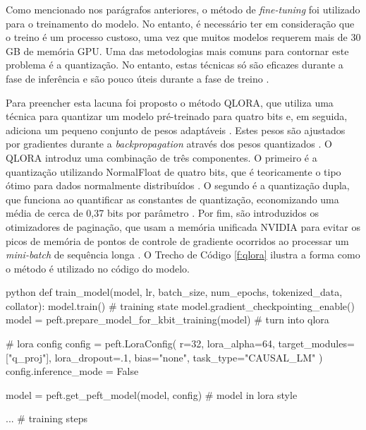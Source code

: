Como mencionado nos parágrafos anteriores, o método de \textit{fine-tuning} foi utilizado para o treinamento do modelo. No entanto, é necessário ter em consideração que o treino é um processo custoso, uma vez que muitos modelos requerem mais de 30 GB de memória GPU. Uma das metodologias mais comuns para contornar este problema é a quantização. No entanto, estas técnicas só são eficazes durante a fase de inferência e são pouco úteis durante a fase de treino \cite{qlora}. 

Para preencher esta lacuna foi proposto o método QLORA, que utiliza uma técnica para quantizar um modelo pré-treinado para quatro bits e, em seguida, adiciona um pequeno conjunto de pesos adaptáveis \cite{qlora}. Estes pesos são ajustados por gradientes durante a \emph{backpropagation} através dos pesos quantizados \cite{qlora}.
O QLORA introduz uma combinação de três componentes. O primeiro é a quantização utilizando NormalFloat de quatro bits, que é teoricamente o tipo ótimo para dados normalmente distribuídos \cite{qlora}. O segundo é a quantização dupla, que funciona ao quantificar as constantes de quantização, economizando uma média de cerca de 0,37 bits por parâmetro \cite{qlora}. Por fim, são introduzidos os otimizadores de paginação, que usam a memória unificada NVIDIA para evitar os picos de memória de pontos de controle de gradiente ocorridos ao processar um \textit{mini-batch} de sequência longa \cite{qlora}. O Trecho de Código \ref{f:qlora} ilustra a forma como o método é utilizado no código do modelo.

\begin{code}
    \label{f:qlora}
    \begin{mintedbox}{python}
    def train_model(model, lr, batch_size, num_epochs, tokenized_data, collator):
        model.train() # training state
        model.gradient_checkpointing_enable()
        model = peft.prepare_model_for_kbit_training(model) # turn into qlora
    
        # lora config
        config = peft.LoraConfig(
            r=32,
            lora_alpha=64,
            target_modules=["q_proj"],
            lora_dropout=.1,
            bias="none",
            task_type="CAUSAL_LM"
        )
        config.inference_mode = False
    
        model = peft.get_peft_model(model, config) # model in lora style
    
        ... # training steps
    \end{mintedbox}
\end{code}

